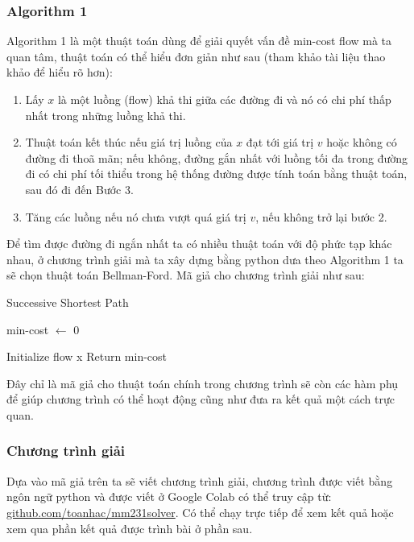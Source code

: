 \documentclass[a4paper]{article}
\begin{document}
\subsubsection{Algorithm 1}
Algorithm 1 là một thuật toán dùng để giải quyết vấn đề min-cost flow mà ta quan tâm, thuật toán có thể hiểu đơn giản như sau (tham khảo tài liệu thao khảo để hiểu rõ hơn): 
\begin{enumerate}
\item Lấy $x$ là một luồng (flow) khả thi giữa các đường đi và nó có chi phí thấp nhất trong những luồng khả thi.
\item Thuật toán kết thúc nếu giá trị luồng của $x$ đạt tới giá trị $v$ hoặc không có đường đi thoã mãn; nếu không, đường gắn nhất với luồng tối đa trong đường đi có chi phí tối thiểu trong hệ thống đường được tính toán bằng thuật toán, sau đó đi đến Bước 3.
\item Tăng các luồng nếu nó chưa vượt quá giá trị $v$, nếu không trở lại bước 2.
\end{enumerate}

Để tìm được đường đi ngắn nhất ta có nhiều thuật toán với độ phức tạp khác nhau, ở chương trình giải mà ta xây dựng bằng python dưa theo Algorithm 1 ta sẽ chọn thuật toán Bellman-Ford. Mã giả cho chương trình giải như sau:

\begin{algorithm}
\caption{Successive Shortest Path}
min-cost $\gets$ 0

Initialize flow x
Return min-cost
\end{algorithm}

Đây chỉ là mã giả cho thuật toán chính trong chương trình sẽ còn các hàm phụ để giúp chương trình có thể hoạt động cũng như đưa ra kết quả một cách trực quan.


\subsubsection{Chương trình giải}
Dựa vào mã giả trên ta sẽ viết chương trình giải, chương trình được viết bằng ngôn ngữ python và được viết ở Google Colab có thể truy cập từ: \href{github.com/toanhac/mm231solver}{github.com/toanhac/mm231solver}. Có thể chạy trực tiếp để xem kết quả hoặc xem qua phần kết quả được trình bài ở phần sau.
\end{document}
